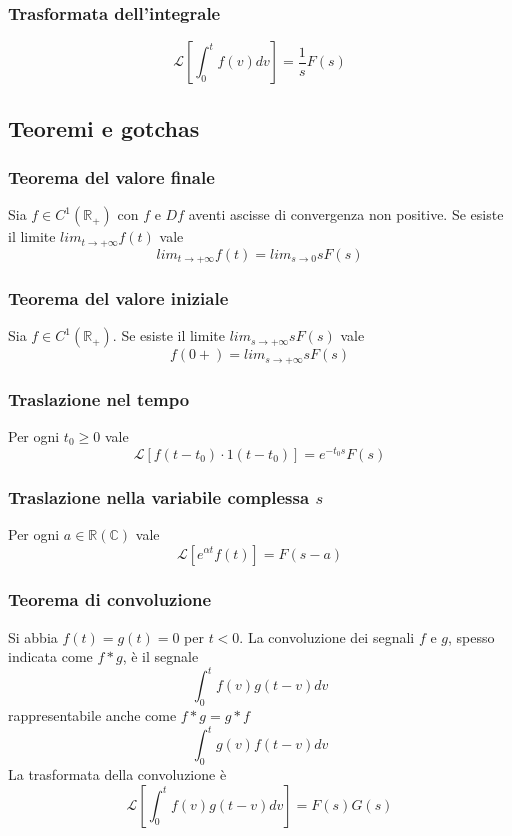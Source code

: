 \documentclass[11pt]{article}
\begin{document}
\subsubsection{Trasformata dell'integrale}
\begin{displaymath}
    \mathcal{L}\left[\int_0^t f(v) dv\right] = \frac{1}{s} F(s)
\end{displaymath}
\subsection{Teoremi e gotchas}
\subsubsection{Teorema del valore finale}
Sia $f\in C^1 (\mathbb{R}_+)$ con $f$ e $Df$ aventi ascisse di convergenza non positive. Se esiste il limite $lim_{t\rightarrow+\infty} f(t)$ vale
\begin{displaymath}
    lim_{t\rightarrow+\infty} f(t) = lim_{s\rightarrow0} sF(s)
\end{displaymath}
\subsubsection{Teorema del valore iniziale}
Sia $f\in C^1 (\mathbb{R}_+)$. Se esiste il limite $lim_{s\rightarrow+\infty} sF(s)$ vale
\begin{displaymath}
    f(0+)=lim_{s\rightarrow+\infty} sF(s)
\end{displaymath}
\subsubsection{Traslazione nel tempo}
Per ogni $t_0 \ge 0$ vale
\begin{displaymath}
    \mathcal{L}[f(t-t_0)\cdot 1(t-t_0)]= e^{-t_0s}F(s)
\end{displaymath}
\subsubsection{Traslazione nella variabile complessa $s$}
Per ogni $a \in \mathbb{R}(\mathbb{C})$ vale
\begin{displaymath}
    \mathcal{L}[e^{\alpha t} f(t)] = F(s-a)
\end{displaymath}
\subsubsection{Teorema di convoluzione}
Si abbia $f(t) = g(t)=0$ per $t<0$. La convoluzione dei segnali $f$ e $g$, spesso indicata come $f*g$, è il segnale
\begin{displaymath}
    \int_0^t f(v)g(t-v)dv
\end{displaymath}
rappresentabile anche come $f*g=g*f$
\begin{displaymath}
    \int_0^t g(v) f(t-v) dv
\end{displaymath}
La trasformata della convoluzione è
\begin{displaymath}
    \mathcal{L}\left[    \int_0^t f(v)g(t-v)dv\right] = F(s)G(s)
\end{displaymath}
\end{document}
